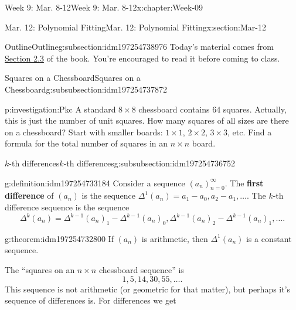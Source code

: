\documentclass[oneside,10pt,]{book}
\newcommand{\terminology}[1]{\textbf{#1}}
\numberwithin{equation}{section}
\begin{document}
\begin{chapterptx}{Week 9: Mar. 8-12}{}{Week 9: Mar. 8-12}{}{}{x:chapter:Week-09}
\begin{sectionptx}{Mar. 12: Polynomial Fitting}{}{Mar. 12: Polynomial Fitting}{}{}{x:section:Mar-12}
\typeout{************************************************}
%
\begin{subsectionptx}{Outline}{}{Outline}{}{}{g:subsection:idm197254738976}
Today's material comes from \href{http://discrete.openmathbooks.org/dmoi3/sec_polyfit.html}{Section 2.3} of the book. You're encouraged to read it before coming to class.%
%
%
\typeout{************************************************}
\typeout{************************************************}
%
\begin{subsubsectionptx}{Squares on a Chessboard}{}{Squares on a Chessboard}{}{}{g:subsubsection:idm197254737872}
\begin{investigation}{}{p:investigation:Pkc}%
A standard \(8 \times 8\) chessboard contains 64 squares. Actually, this is just the number of unit squares. How many squares of all sizes are there on a chessboard? Start with smaller boards: \(1\times 1\), \(2 \times 2\), \(3\times 3\), etc. Find a formula for the total number of squares in an \(n\times n\) board.%
\end{investigation}%
%
%
\typeout{************************************************}
\typeout{************************************************}
%
\begin{subsubsectionptx}{\(k\)-th differences}{}{\(k\)-th differences}{}{}{g:subsubsection:idm197254736752}
\begin{definition}{}{g:definition:idm197254733184}%
Consider a sequence \((a_n)_{n=0}^\infty\). The \terminology{first difference} of \((a_n)\) is the sequence \(\Delta^1(a_n) = a_1 - a_0, a_2 - a_1, \ldots\). The \(k\)-th difference sequence is the sequence%
\begin{equation*}
\Delta^k(a_n) = \Delta^{k-1}(a_n)_1 - \Delta^{k-1}(a_n)_0, \Delta^{k-1}(a_n)_2 - \Delta^{k-1}(a_n)_1,  \ldots.
\end{equation*}
%
\end{definition}
\begin{theorem}{}{}{g:theorem:idm197254732800}%
If \((a_n)\) is arithmetic, then \(\Delta^1(a_n)\) is a constant sequence.%
\end{theorem}
The ``squares on an \(n\times n\) chessboard sequence'' is%
%
\begin{equation*}
1, 5, 14, 30, 55, \ldots.
\end{equation*}
This sequence is not arithmetic (or geometric for that matter), but perhaps it's sequence of differences is. For differences we get%

\end{subsubsectionptx}
\end{subsubsectionptx}
\end{subsectionptx}
\end{sectionptx}
\end{chapterptx}
\end{document}
